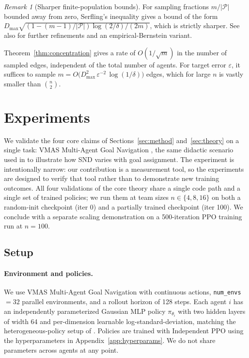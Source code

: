 \documentclass[11pt]{article}
\theoremstyle{plain}
\theoremstyle{definition}
\theoremstyle{remark}
\newtheorem{remark}[theorem]{Remark}
\newcommand{\Pairs}{\mathcal{P}}         %
\newcommand{\policy}[1]{\pi_{\theta_{#1}}}
\begin{document}
\begin{remark}[Sharper finite-population bounds]
\label{rem:serfling}
For sampling fractions $m/|\Pairs|$ bounded away from zero, Serfling's
inequality \citep{serfling1974probability} gives a bound of the form
$D_{\max}\sqrt{(1 - (m-1)/|\Pairs|)\log(2/\delta)/(2m)}$, which is strictly
sharper. See also \citet{bardenet2015concentration} for further
refinements and an empirical-Bernstein variant.
\end{remark}

Theorem~\ref{thm:concentration} gives a rate of $O(1/\sqrt{m})$ in the
number of sampled edges, independent of the total number of agents. For
target error $\varepsilon$, it suffices to sample
$m = O\bigl(D_{\max}^2\, \varepsilon^{-2}\, \log(1/\delta)\bigr)$ edges,
which for large $n$ is vastly smaller than $\binom{n}{2}$.

\section{Experiments}
\label{sec:experiments}

We validate the four core claims of Sections~\ref{sec:method}
and~\ref{sec:theory} on a single task: VMAS Multi-Agent Goal Navigation
\citep{bettini2022vmas}, the same didactic scenario used in
\citet{bettini2025snd} to illustrate how SND varies with goal
assignment. The experiment is intentionally narrow: our contribution is
a measurement tool, so the experiments are designed to verify that tool
rather than to demonstrate new training outcomes. All four validations of the core theory share a single code path and
a single set of trained policies; we run them at team sizes $n \in
\{4, 8, 16\}$ on both a random-init checkpoint (iter 0) and a
partially trained checkpoint (iter 100). We conclude with a separate
scaling demonstration on a 500-iteration PPO training run at $n=100$.

\subsection{Setup}
\label{sec:experiments:setup}

\paragraph{Environment and policies.} We use VMAS Multi-Agent Goal
Navigation with continuous actions, \texttt{num\_envs}~$= 32$ parallel
environments, and a rollout horizon of 128 steps. Each agent $i$ has an
independently parameterized Gaussian MLP policy $\policy{i}$ with two
hidden layers of width 64 and per-dimension learnable log\nobreakdash-standard\nobreakdash-deviation, matching the heterogeneous-policy setup of
\citet{bettini2025snd}. Policies are trained with Independent PPO using
the hyperparameters in Appendix~\ref{app:hyperparams}. We do not share
parameters across agents at any point.
\end{document}
